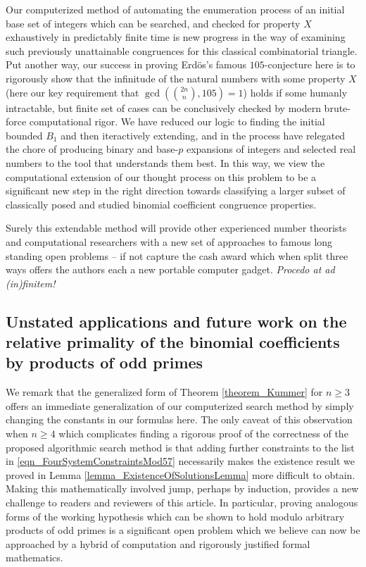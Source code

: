 \documentclass[12pt]{article}
\begin{document}
Our computerized method of automating the enumeration process 
of an initial base set of integers which can be searched, and checked for property $X$ exhaustively in 
predictably finite time is new progress in the way of examining such previously unattainable 
congruences for this classical combinatorial triangle. Put another way, our success in proving 
Erd\"os's famous $105$-conjecture here is to rigorously show that the infinitude of the natural numbers 
with some property $X$ (here our key requirement that $\gcd(\binom{2n}{n}, 105)=1$) holds if 
some humanly intractable, but finite set of cases can be conclusively checked by modern brute-force 
computational rigor. We have reduced our logic to finding the initial bounded $B_1$ and 
then iteractively extending, and in the process have relegated the chore of producing binary and 
base-$p$ expansions of integers and selected real numbers to the tool that understands them best. 
In this way, we view the computational extension of our thought process on this problem to be a 
significant new step in the right direction towards classifying a larger subset of classically 
posed and studied binomial coefficient congruence properties. 

Surely this extendable method will 
provide other experienced number theorists and computational researchers with a new set of 
approaches to famous long standing open problems -- if not capture the cash award which when 
split three ways offers the authors each a new portable computer gadget. 
\emph{Procedo at ad (in)finitem!}

\subsection{Unstated applications and future work on the relative primality of the binomial coefficients by 
     products of odd primes} 
     
We remark that the generalized form of Theorem \ref{theorem_Kummer} for $n \geq 3$ offers an 
immediate generalization of our computerized search method by simply changing the constants in our 
formulas here. The only caveat of this observation when $n \geq 4$ which complicates finding a 
rigorous proof of the correctness of the proposed algorithmic search method is that adding further 
constraints to the list in \eqref{eqn_FourSystemConstraintsMod57} necessarily makes the existence 
result we proved in Lemma \ref{lemma_ExistenceOfSolutionsLemma} more difficult to obtain. 
Making this mathematically 
involved jump, perhaps by induction, provides a new challenge to readers and reviewers of this article. 
In particular, proving analogous forms of the working hypothesis which can be shown to hold modulo 
arbitrary products of odd primes is a significant open problem which we believe can now be 
approached by a hybrid of computation and rigorously justified formal mathematics. 
\end{document}
